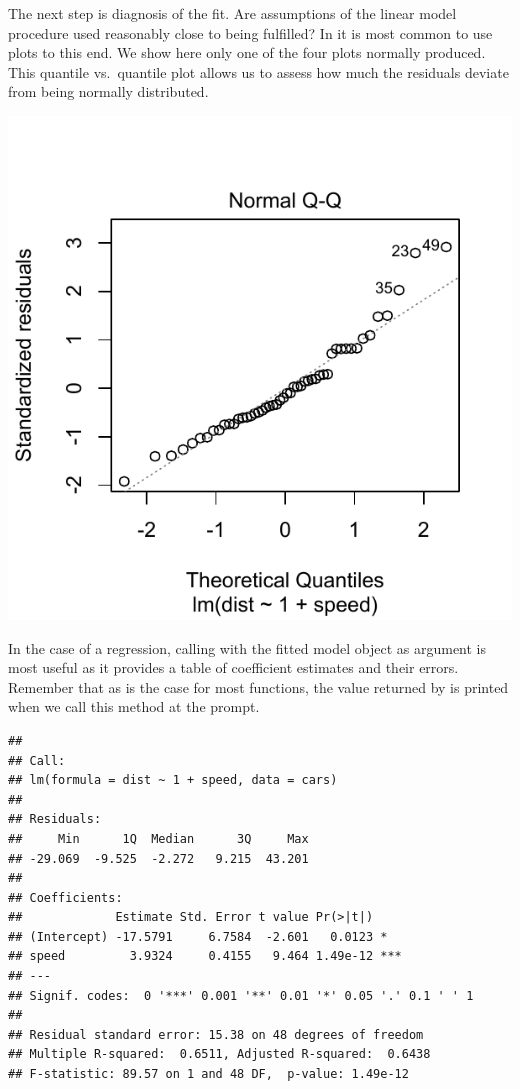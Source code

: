 \documentclass[krantz2]{krantz}\usepackage{knitr}
\begin{document}
The next step is diagnosis of the fit. Are assumptions of the linear model procedure used reasonably close to being fulfilled? In \Rlang it is most common to use plots to this end. We show here only one of the four plots normally produced. This quantile vs.\ quantile plot allows us to assess how much the residuals deviate from being normally distributed.

\begin{knitrout}\footnotesize
{}\color{fgcolor}\begin{kframe}
\begin{alltt}
  \hlstd{=} \hlstd{)}
\end{alltt}
\end{kframe}

{\centering \includegraphics[width=.54\textwidth]{figure/pos-models-1a-1} 

}


\end{knitrout}

In the case of a regression, calling  with the fitted model object as argument is most useful as it provides a table of coefficient estimates and their errors. Remember that as is the case for most \Rlang functions, the value returned by  is printed when we call this method at the \Rlang prompt.

\begin{knitrout}\footnotesize
{}\color{fgcolor}\begin{kframe}
\begin{alltt}
\end{alltt}
\begin{verbatim}
## 
## Call:
## lm(formula = dist ~ 1 + speed, data = cars)
## 
## Residuals:
##     Min      1Q  Median      3Q     Max 
## -29.069  -9.525  -2.272   9.215  43.201 
## 
## Coefficients:
##             Estimate Std. Error t value Pr(>|t|)    
## (Intercept) -17.5791     6.7584  -2.601   0.0123 *  
## speed         3.9324     0.4155   9.464 1.49e-12 ***
## ---
## Signif. codes:  0 '***' 0.001 '**' 0.01 '*' 0.05 '.' 0.1 ' ' 1
## 
## Residual standard error: 15.38 on 48 degrees of freedom
## Multiple R-squared:  0.6511,	Adjusted R-squared:  0.6438 
## F-statistic: 89.57 on 1 and 48 DF,  p-value: 1.49e-12
\end{verbatim}
\end{kframe}
\end{knitrout}
\end{document}

